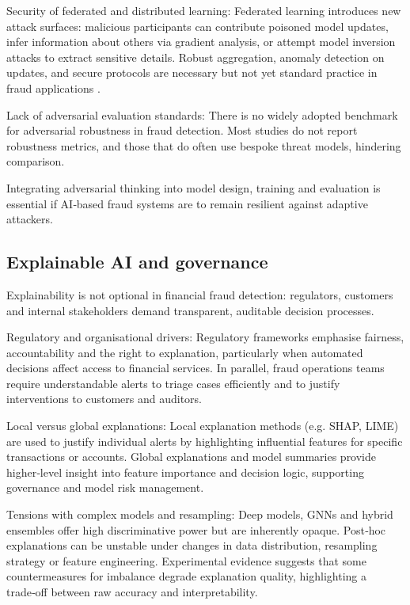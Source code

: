 \documentclass[a4paper,fleqn]{cas-dc}
\begin{document}
Security of federated and distributed learning: Federated learning introduces new attack surfaces: malicious participants can contribute poisoned model updates, infer information about others via gradient analysis, or attempt model inversion attacks to extract sensitive details. 
Robust aggregation, anomaly detection on updates, and secure protocols are necessary but not yet standard practice in fraud applications \cite{ranganatha_enhancing_2025}. 

Lack of adversarial evaluation standards: There is no widely adopted benchmark for adversarial robustness in fraud detection. 
Most studies do not report robustness metrics, and those that do often use bespoke threat models, hindering comparison.

Integrating adversarial thinking into model design, training and evaluation is essential if AI‑based fraud systems are to remain resilient against adaptive attackers.

\subsection{Explainable AI and governance}
Explainability is not optional in financial fraud detection: regulators, customers and internal stakeholders demand transparent, auditable decision processes.

Regulatory and organisational drivers: Regulatory frameworks emphasise fairness, accountability and the right to explanation, particularly when automated decisions affect access to financial services. 
In parallel, fraud operations teams require understandable alerts to triage cases efficiently and to justify interventions to customers and auditors.

Local versus global explanations: Local explanation methods (e.g. SHAP, LIME) are used to justify individual alerts by highlighting influential features for specific transactions or accounts.
Global explanations and model summaries provide higher‑level insight into feature importance and decision logic, supporting governance and model risk management.

Tensions with complex models and resampling: Deep models, GNNs and hybrid ensembles offer high discriminative power but are inherently opaque. 
Post‑hoc explanations can be unstable under changes in data distribution, resampling strategy or feature engineering. 
Experimental evidence suggests that some countermeasures for imbalance degrade explanation quality, highlighting a trade‑off between raw accuracy and interpretability.
\end{document}
